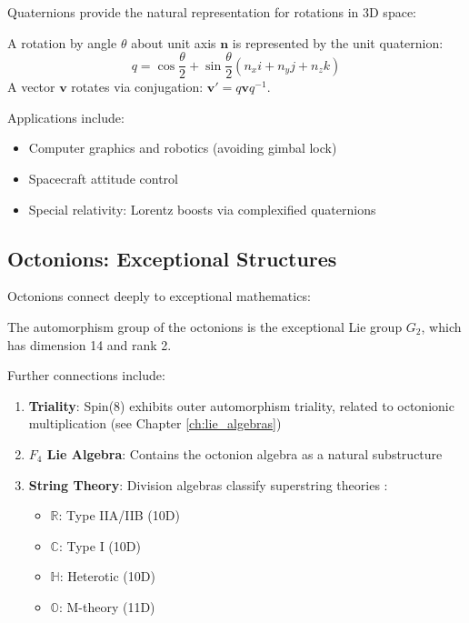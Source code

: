 Quaternions provide the natural representation for rotations in 3D space:

\begin{theorem}
A rotation by angle $\theta$ about unit axis $\mathbf{n}$ is represented by the unit quaternion:
\begin{equation}
    q = \cos\frac{\theta}{2} + \sin\frac{\theta}{2}(n_x i + n_y j + n_z k)
\end{equation}
A vector $\mathbf{v}$ rotates via conjugation: $\mathbf{v}' = q \mathbf{v} q^{-1}$.
\end{theorem}

Applications include:
\begin{itemize}
    \item Computer graphics and robotics (avoiding gimbal lock)
    \item Spacecraft attitude control
    \item Special relativity: Lorentz boosts via complexified quaternions
\end{itemize}

\subsection{Octonions: Exceptional Structures}

Octonions connect deeply to exceptional mathematics:

\begin{theorem}
The automorphism group of the octonions is the exceptional Lie group $G_2$, which has dimension 14 and rank 2.
\end{theorem}

Further connections include:
\begin{enumerate}
    \item \textbf{Triality}: Spin(8) exhibits outer automorphism triality, related to octonionic multiplication (see Chapter \ref{ch:lie_algebras})
    \item \textbf{$F_4$ Lie Algebra}: Contains the octonion algebra as a natural substructure
    \item \textbf{String Theory}: Division algebras classify superstring theories \cite{dixon1994octonions}:
    \begin{itemize}
        \item $\mathbb{R}$: Type IIA/IIB (10D)
        \item $\mathbb{C}$: Type I (10D)
        \item $\mathbb{H}$: Heterotic (10D)
        \item $\mathbb{O}$: M-theory (11D)
    \end{itemize}
\end{enumerate}


